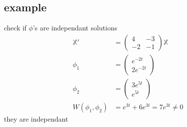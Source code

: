 \documentclass{article}
\begin{document}
\subsection*{example}
check if $\phi$'s are independant solutions
\begin{align*}
  \mathbb{X}'&=\left(\begin{array}{cc}4&-3\\-2&-1 \end{array}\right)\mathbb{X}\\
  \phi_1&=\left(\begin{array}{c}e^{-2t}\\2e^{-2t} \end{array}\right)\\
  \phi_2&=\left(\begin{array}{c}3e^{5t}\\e^{5t} \end{array}\right)\\
  W(\phi_1,\phi_2)&=e^{3t}+6e^{3t}=7e^{3t}\neq0
\end{align*}
they are independant
\end{document}
